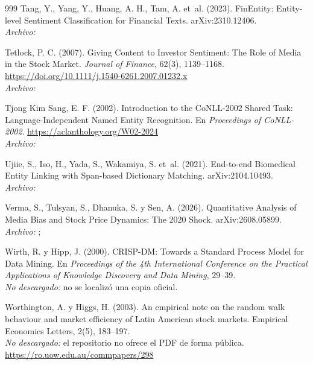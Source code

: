 \begin{thebibliography}{999}
Tang, Y., Yang, Y., Huang, A. H., Tam, A. et~al. (2023). {FinEntity}: Entity-level Sentiment Classification for Financial Texts. arXiv:2310.12406.
\\\textit{Archivo:} 

Tetlock, P. C. (2007). Giving Content to Investor Sentiment: The Role of Media in the Stock Market. \emph{Journal of Finance}, 62(3), 1139--1168. \url{https://doi.org/10.1111/j.1540-6261.2007.01232.x}
\\\textit{Archivo:} 

Tjong Kim Sang, E. F. (2002). Introduction to the {CoNLL-2002} Shared Task: Language-Independent Named Entity Recognition. En \emph{Proceedings of CoNLL-2002}. \url{https://aclanthology.org/W02-2024}
\\\textit{Archivo:} 

Ujiie, S., Iso, H., Yada, S., Wakamiya, S. et~al. (2021). End-to-end Biomedical Entity Linking with Span-based Dictionary Matching. arXiv:2104.10493.
\\\textit{Archivo:} 

Verma, S., Tulsyan, S., Dhanuka, S. y Sen, A. (2026). Quantitative Analysis of Media Bias and Stock Price Dynamics: The 2020 Shock. arXiv:2608.05899.
\\\textit{Archivo:} ; 

Wirth, R. y Hipp, J. (2000). {CRISP-DM}: Towards a Standard Process Model for Data Mining. En \emph{Proceedings of the 4th International Conference on the Practical Applications of Knowledge Discovery and Data Mining}, 29--39.
\\\textit{No descargado:} no se localizó una copia oficial.

Worthington, A. y Higgs, H. (2003). An empirical note on the random walk behaviour and market efficiency of Latin American stock markets. Empirical Economics Letters, 2(5), 183–197.
\\\textit{No descargado:} el repositorio no ofrece el PDF de forma pública. \url{https://ro.uow.edu.au/commpapers/298}


\end{thebibliography}
